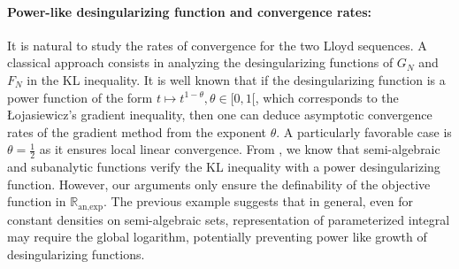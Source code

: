 \documentclass[11pt]{article}
\newcommand{\R}{\mathbb R}
\newcommand{\1}{\mathbbm{1}}
\numberwithin{equation}{section}
\begin{document}
\paragraph{Power-like desingularizing function and convergence rates:}
It is natural to study the rates of convergence for the two Lloyd sequences. A classical approach consists in analyzing the desingularizing functions of $G_N$ and $F_N$ in the KL inequality. It is well known \cite{BolteAttouchcvproximalalgoanalyticfeatures} that if the desingularizing function is a power function of the form $t\mapsto t^{1-\theta}, \theta\in [0,1[$, which corresponds to the \L{}ojasiewicz's gradient inequality, then one can deduce asymptotic convergence rates of the gradient method from the exponent $\theta$. A particularly favorable case is $\theta=\frac{1}{2}$ as it ensures local linear convergence. From  \cite{kurdyka1994wf,bolte2007lojasiewicz}, we know that semi-algebraic and subanalytic functions verify the KL inequality with a power desingularizing function. However, our arguments only ensure the definability of the objective function in $\R_{\text{an,exp}}$. The previous example suggests that in general, even for constant densities on semi-algebraic sets, representation of parameterized integral may require the global logarithm, potentially preventing power like growth of desingularizing functions.
\end{document}
